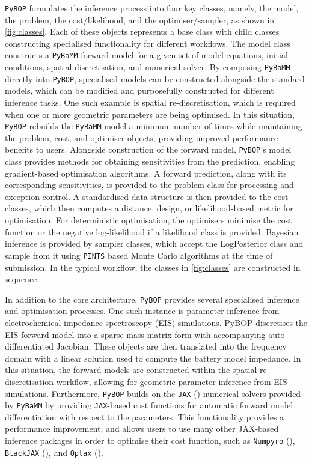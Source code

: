\documentclass[
]{article}
\begin{document}
\texttt{PyBOP} formulates the inference process into four key classes,
namely, the model, the problem, the cost/likelihood, and the
optimiser/sampler, as shown in \autoref{fig:classes}. Each of these
objects represents a base class with child classes constructing
specialised functionality for different workflows. The model class
constructs a \texttt{PyBaMM} forward model for a given set of model
equations, initial conditions, spatial discretisation, and numerical
solver. By composing \texttt{PyBaMM} directly into \texttt{PyBOP},
specialised models can be constructed alongside the standard models,
which can be modified and purposefully constructed for different
inference tasks. One such example is spatial re-discretisation, which is
required when one or more geometric parameters are being optimised. In
this situation, \texttt{PyBOP} rebuilds the \texttt{PyBaMM} model a
minimum number of times while maintaining the problem, cost, and
optimiser objects, providing improved performance benefits to users.
Alongside construction of the forward model, \texttt{PyBOP}'s model
class provides methods for obtaining sensitivities from the prediction,
enabling gradient-based optimisation algorithms. A forward prediction,
along with its corresponding sensitivities, is provided to the problem
class for processing and exception control. A standardised data
structure is then provided to the cost classes, which then computes a
distance, design, or likelihood-based metric for optimisation. For
deterministic optimisation, the optimisers minimise the cost function or
the negative log-likelihood if a likelihood class is provided. Bayesian
inference is provided by sampler classes, which accept the LogPosterior
class and sample from it using \texttt{PINTS} based Monte Carlo
algorithms at the time of submission. In the typical workflow, the
classes in \autoref{fig:classes} are constructed in sequence.

In addition to the core architecture, \texttt{PyBOP} provides several
specialised inference and optimisation processes. One such instance is
parameter inference from electrochemical impedance spectroscopy (EIS)
simulations. PyBOP discretises the EIS forward model into a sparse mass
matrix form with accompanying auto-differentiated Jacobian. These
objects are then translated into the frequency domain with a linear
solution used to compute the battery model impedance. In this situation,
the forward models are constructed within the spatial re-discretisation
workflow, allowing for geometric parameter inference from EIS
simulations. Furthermore, \texttt{PyBOP} builds on the \texttt{JAX}
() numerical solvers
provided by \texttt{PyBaMM} by providing \texttt{JAX}-based cost
functions for automatic forward model differentiation with respect to
the parameters. This functionality provides a performance improvement,
and allows users to use many other JAX-based inference packages in order
to optimise their cost function, such as \texttt{Numpyro}
(), \texttt{BlackJAX}
(), and \texttt{Optax}
().
\end{document}
